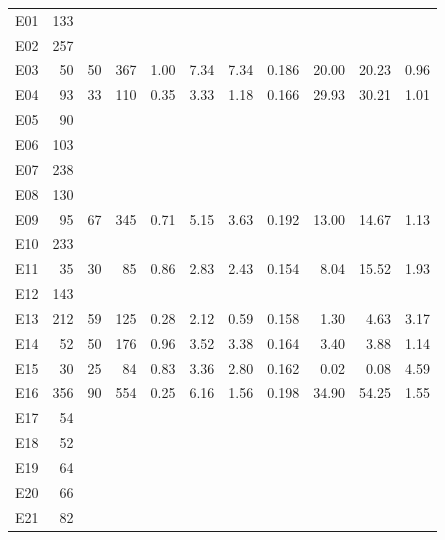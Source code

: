 \documentclass[sigconf,review]{acmart}
\begin{document}
\begin{table}[]
\begin{tabular}{crrrrrrrrrr}
		E01 & 133 &    &     &      &      &      &       &        &        &      \\
		E02 & 257 &    &     &      &      &      &       &        &        &      \\
		E03 & 50  & 50 & 367 & 1.00 & 7.34 & 7.34 & 0.186 & 20.00 & 20.23  & 0.96 \\
		E04 & 93  & 33 & 110 & 0.35 & 3.33 & 1.18 & 0.166 & 29.93 & 30.21 & 1.01 \\
		E05 & 90  &    &     &      &      &      &       &        &        &      \\
		E06 & 103 &    &     &      &      &      &       &        &        &      \\
		E07 & 238 &    &     &      &      &      &       &        &        &      \\
		E08 & 130 &    &     &      &      &      &       &        &        &      \\
		E09 & 95  & 67 & 345 & 0.71 & 5.15 & 3.63 & 0.192 & 13.00 & 14.67  & 1.13 \\
		E10 & 233 &    &     &      &      &      &       &        &        &      \\
		E11 & 35  & 30 & 85  & 0.86 & 2.83 & 2.43 & 0.154 & 8.04  & 15.52  & 1.93 \\
		E12 & 143 &    &     &      &      &      &       &        &        &      \\
		E13 & 212 & 59 & 125 & 0.28 & 2.12 & 0.59 & 0.158 & 1.30  & 4.63  & 3.17 \\
		E14 & 52  & 50 & 176 & 0.96 & 3.52 & 3.38 & 0.164 & 3.40  & 3.88  & 1.14 \\
		E15 & 30  & 25 & 84  & 0.83 & 3.36 & 2.80 & 0.162 & 0.02  & 0.08  & 4.59 \\
		E16 & 356 & 90 & 554 & 0.25 & 6.16 & 1.56 & 0.198 & 34.90 & 54.25 & 1.55 \\
		E17 & 54  &    &     &      &      &      &       &        &        &      \\
		E18 & 52  &    &     &      &      &      &       &        &        &      \\
		E19 & 64  &    &     &      &      &      &       &        &        &      \\
		E20 & 66  &    &     &      &      &      &       &        &        &      \\
		E21 & 82  &    &     &      &      &      &       &        &        &      \\ \hline
	\end{tabular}
\end{table}
\end{document}
